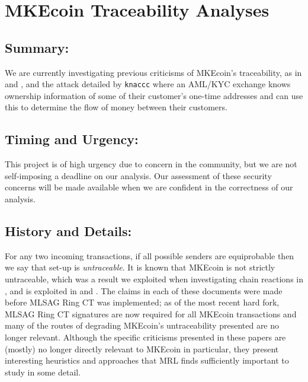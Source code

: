 \documentclass[12pt,english]{mrl}
\theoremstyle{definition}
\numberwithin{equation}{section}
\numberwithin{figure}{section}
\numberwithin{equation}{section}
\numberwithin{equation}{section}
\numberwithin{figure}{section}
\begin{document}
\section{MKEcoin Traceability Analyses}

\subsection{Summary:} 

We are currently investigating previous criticisms of MKEcoin's traceability, as in \cite{miller2017empirical} and \cite{kumar2017traceability}, and the attack detailed by \texttt{knaccc}  where an AML/KYC exchange knows ownership information of some of their customer's one-time addresses and can use this to determine the flow of money between their customers.

\subsection{Timing and Urgency:} 

This project is of high urgency due to concern in the community, but we are not self-imposing a deadline on our analysis. Our assessment of these security concerns will be made available when we are confident in the correctness of our analysis.

\subsection{History and Details:} 

For any two incoming transactions, if all possible senders are equiprobable then we say that set-up is \textit{untraceable}. It is known that MKEcoin is not strictly untraceable, which was a result we exploited when investigating chain reactions in \cite{noether2014note}, and is exploited in \cite{miller2017empirical} and \cite{kumar2017traceability}. The claims in each of these documents were made before MLSAG Ring CT was implemented; as of the most recent hard fork, MLSAG Ring CT signatures are now required for all MKEcoin transactions and many of the routes of degrading MKEcoin's untraceability presented are no longer relevant. Although the specific criticisms presented in these papers are (mostly) no longer directly relevant to MKEcoin in particular, they present interesting heuristics and approaches that MRL finds sufficiently important to study in some detail.
\end{document}
